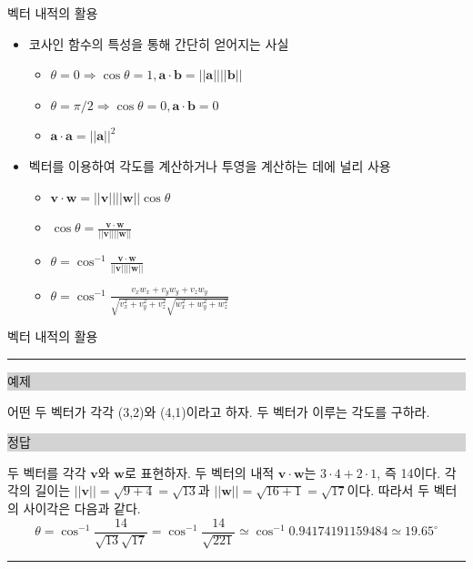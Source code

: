 \documentclass{beamer}
\begin{document}
\begin{frame}{벡터 내적의 활용}
\begin{itemize}
\item 코사인 함수의 특성을 통해 간단히 얻어지는 사실
	\begin{itemize}
	\item $\theta = 0 \Rightarrow \cos \theta = 1 , \mathbf a \cdot \mathbf b = ||\mathbf a|| ||\mathbf b|| $
	\item $\theta = \pi / 2 \Rightarrow \cos \theta = 0, \mathbf a \cdot \mathbf b = 0 $
	\item $\mathbf a \cdot \mathbf a =  ||\mathbf a||^2$
	\end{itemize}
\end{itemize}


\begin{itemize}
\item 벡터를 이용하여 각도를 계산하거나 투영을 계산하는 데에 널리 사용
	\begin{itemize}
	\item $ \mathbf v \cdot \mathbf w  =  ||\mathbf v|| ||\mathbf w|| \cos \theta $
	\item $ \cos \theta = \frac{\mathbf v \cdot \mathbf w}{||\mathbf v||||\mathbf w||} $
	\item $ \theta  = \cos^{-1} \frac{\mathbf v \cdot \mathbf w}{||\mathbf v||||\mathbf w||} $
	\item $ \theta =  \cos^{-1}\frac{ v_x w_x + v_y w_y + v_z w_y}{\sqrt{v_x^2 + v_y^2 + v_z^2} \sqrt{w_x^2 + w_y^2 + w_z^2} }$
	\end{itemize} 
\end{itemize}

\end{frame}


\begin{frame}{벡터 내적의 활용}
\hrule

\noindent \colorbox{lightgray}{\begin{minipage}{6cm}예제\end{minipage}} 


\noindent 어떤 두 벡터가 각각 (3,2)와 (4,1)이라고 하자. 두 벡터가 이루는 각도를 구하라.

\noindent \colorbox{lightgray}{\begin{minipage}{6cm}정답\end{minipage}} 

\noindent 두 벡터를 각각 $\mathbf v$와 $\mathbf w$로 표현하자. 두 벡터의 내적 $\mathbf v \cdot \mathbf w$는 $3 \cdot 4 + 2 \cdot 1$, 즉 14이다.
각각의 길이는 $||\mathbf v|| = \sqrt{9+4} = \sqrt{13}$과 $||\mathbf w|| = \sqrt{16+1} = \sqrt{17}$이다.
따라서 두 벡터의 사이각은 다음과 같다.
$$\theta = \cos^{-1} \frac{14}{\sqrt{13} \sqrt{17}} = \cos^{-1} \frac{14}{\sqrt{221}} \simeq \cos^{-1} 0.94174191159484 \simeq 19.65 ^{\circ}$$

\hrule

\end{frame}
\end{document}
